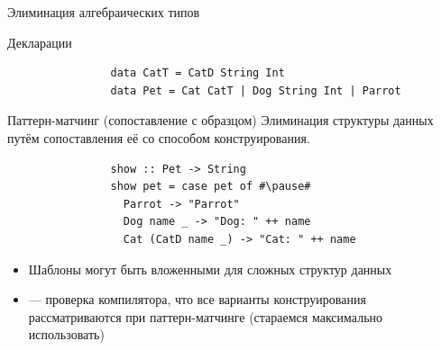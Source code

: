     \begin{frame}[fragile]{Элиминация алгебраических типов}
        \vspace{-0.5em}
        \begin{block}{Декларации}
            \begin{verbatim}
                data CatT = CatD String Int
                data Pet = Cat CatT | Dog String Int | Parrot
            \end{verbatim}
        \end{block}
        \begin{block}{Паттерн-матчинг (сопоставление с образцом)}
            Элиминация структуры данных путём сопоставления её со способом конструирования.
            \begin{verbatim}
                show :: Pet -> String
                show pet = case pet of #\pause#
                  Parrot -> "Parrot"
                  Dog name _ -> "Dog: " ++ name
                  Cat (CatD name _) -> "Cat: " ++ name
            \end{verbatim}
            \begin{itemize}
                \item Шаблоны могут быть вложенными для сложных структур данных
                \item[\defi]  --- проверка компилятора, что все варианты конструирования рассматриваются при паттерн-матчинге (стараемся максимально использовать)
            \end{itemize}
        \end{block}
    \end{frame}

